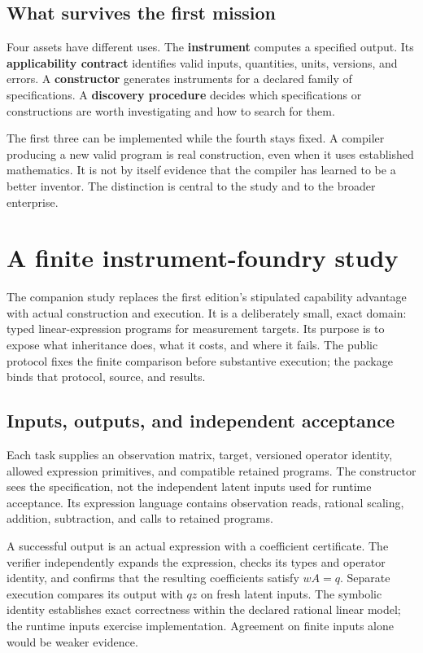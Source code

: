 \documentclass[10pt,a4paper]{article}
\begin{document}
\subsection{What survives the first mission}

Four assets have different uses. The \textbf{instrument} computes a specified output. Its \textbf{applicability contract} identifies valid inputs, quantities, units, versions, and errors. A \textbf{constructor} generates instruments for a declared family of specifications. A \textbf{discovery procedure} decides which specifications or constructions are worth investigating and how to search for them.

The first three can be implemented while the fourth stays fixed. A compiler producing a new valid program is real construction, even when it uses established mathematics. It is not by itself evidence that the compiler has learned to be a better inventor. The distinction is central to the study and to the broader enterprise.

\section{A finite instrument-foundry study}\label{sec:foundry}

The companion study replaces the first edition's stipulated capability advantage with actual construction and execution. It is a deliberately small, exact domain: typed linear-expression programs for measurement targets. Its purpose is to expose what inheritance does, what it costs, and where it fails. The public protocol fixes the finite comparison before substantive execution; the package binds that protocol, source, and results.

\subsection{Inputs, outputs, and independent acceptance}

Each task supplies an observation matrix, target, versioned operator identity, allowed expression primitives, and compatible retained programs. The constructor sees the specification, not the independent latent inputs used for runtime acceptance. Its expression language contains observation reads, rational scaling, addition, subtraction, and calls to retained programs.

A successful output is an actual expression with a coefficient certificate. The verifier independently expands the expression, checks its types and operator identity, and confirms that the resulting coefficients satisfy $wA=q$. Separate execution compares its output with $qz$ on fresh latent inputs. The symbolic identity establishes exact correctness within the declared rational linear model; the runtime inputs exercise implementation. Agreement on finite inputs alone would be weaker evidence.
\end{document}
